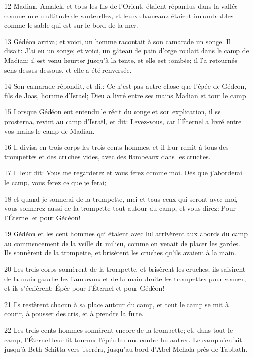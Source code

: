 \par 12 Madian, Amalek, et tous les fils de l'Orient, étaient répandus dans la vallée comme une multitude de sauterelles, et leurs chameaux étaient innombrables comme le sable qui est sur le bord de la mer.
\par 13 Gédéon arriva; et voici, un homme racontait à son camarade un songe. Il disait: J'ai eu un songe; et voici, un gâteau de pain d'orge roulait dans le camp de Madian; il est venu heurter jusqu'à la tente, et elle est tombée; il l'a retournée sens dessus dessous, et elle a été renversée.
\par 14 Son camarade répondit, et dit: Ce n'est pas autre chose que l'épée de Gédéon, fils de Joas, homme d'Israël; Dieu a livré entre ses mains Madian et tout le camp.
\par 15 Lorsque Gédéon eut entendu le récit du songe et son explication, il se prosterna, revint au camp d'Israël, et dit: Levez-vous, car l'Éternel a livré entre vos mains le camp de Madian.
\par 16 Il divisa en trois corps les trois cents hommes, et il leur remit à tous des trompettes et des cruches vides, avec des flambeaux dans les cruches.
\par 17 Il leur dit: Vous me regarderez et vous ferez comme moi. Dès que j'aborderai le camp, vous ferez ce que je ferai;
\par 18 et quand je sonnerai de la trompette, moi et tous ceux qui seront avec moi, vous sonnerez aussi de la trompette tout autour du camp, et vous direz: Pour l'Éternel et pour Gédéon!
\par 19 Gédéon et les cent hommes qui étaient avec lui arrivèrent aux abords du camp au commencement de la veille du milieu, comme on venait de placer les gardes. Ils sonnèrent de la trompette, et brisèrent les cruches qu'ils avaient à la main.
\par 20 Les trois corps sonnèrent de la trompette, et brisèrent les cruches; ils saisirent de la main gauche les flambeaux et de la main droite les trompettes pour sonner, et ils s'écrièrent: Épée pour l'Éternel et pour Gédéon!
\par 21 Ils restèrent chacun à sa place autour du camp, et tout le camp se mit à courir, à pousser des cris, et à prendre la fuite.
\par 22 Les trois cents hommes sonnèrent encore de la trompette; et, dans tout le camp, l'Éternel leur fit tourner l'épée les uns contre les autres. Le camp s'enfuit jusqu'à Beth Schitta vers Tseréra, jusqu'au bord d'Abel Mehola près de Tabbath.

